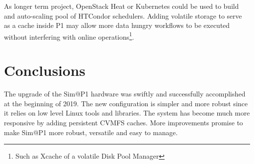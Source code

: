 \documentclass{webofc}
\begin{document}
As longer term project, OpenStack Heat or Kubernetes could be used to build
and auto-scaling pool of HTCondor schedulers. Adding volatile storage to
serve as a cache inside P1 may allow more data hungry workflows to be executed
without interfering with online operations\footnote{Such as Xcache of a volatile
Disk Pool Manager}.

\section{Conclusions}
The upgrade of the Sim@P1 hardware was swiftly and successfully accomplished at
the beginning of 2019. The new configuration is simpler and more robust since
it relies on low level Linux tools and libraries. The system has become much
more responsive by adding persistent CVMFS caches. More improvements promise to
make Sim@P1 more robust, versatile and easy to manage.
\end{document}
